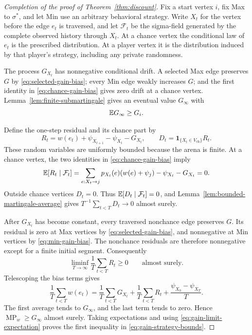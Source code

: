 \begin{proof}[Completion of the proof of Theorem~\ref{thm:discount}]
Fix a start vertex $i$, fix Max to $\sigma^*$, and let Min use an
arbitrary behavioral strategy. Write $X_t$ for the vertex before the
edge $e_t$ is traversed, and let $\mathcal F_t$ be the sigma-field
generated by the complete observed history through $X_t$. At a chance
vertex the conditional law of $e_t$ is the prescribed distribution.
At a player vertex it is the
distribution induced by that player's strategy, including any private
randomness.

The process $G_{X_t}$ has nonnegative conditional drift. A selected Max
edge preserves $G$ by \eqref{eq:selected-gain-bias}; every Min edge
weakly increases $G$; and the first identity in
\eqref{eq:chance-gain-bias} gives zero drift at a chance vertex.
Lemma~\ref{lem:finite-submartingale} gives an eventual value
$G_\infty$ with
\begin{equation}
                         \mathbb E G_\infty\ge G_i.
\label{eq:gain-limit-expectation}
\end{equation}

Define the one-step residual and its chance part by
\[
 R_t=w(e_t)+\psi_{X_{t+1}}-\psi_{X_t}-G_{X_t},
 \qquad
 D_t=\mathbf 1_{\{X_t\in V_{\mathrm{ch}}\}}R_t.
\]
These random variables are uniformly bounded because the arena is
finite. At a chance vertex, the two identities in
\eqref{eq:chance-gain-bias} imply
\[
 \mathbb E[R_t\mid\mathcal F_t]
   =\sum_{e:X_t\to j}p_{X_t}(e)(w(e)+\psi_j)
      -\psi_{X_t}-G_{X_t}=0.
\]
Outside chance vertices $D_t=0$. Thus
$\mathbb E[D_t\mid\mathcal F_t]=0$, and
Lemma~\ref{lem:bounded-martingale-average} gives
$T^{-1}\sum_{t<T}D_t\to0$ almost surely.

After $G_{X_t}$ has become constant, every traversed nonchance edge
preserves $G$. Its residual is zero at Max vertices by
\eqref{eq:selected-gain-bias}, and nonnegative at Min vertices by
\eqref{eq:min-gain-bias}. The nonchance residuals are therefore
nonnegative except for a finite initial segment. Consequently
\[
                    \liminf_{T\to\infty}\frac1T\sum_{t<T}R_t\ge0
                    \qquad\text{almost surely}.
\]
Telescoping the bias terms gives
\begin{equation}
 \frac1T\sum_{t<T}w(e_t)
   =\frac1T\sum_{t<T}G_{X_t}
     +\frac1T\sum_{t<T}R_t
     +\frac{\psi_{X_0}-\psi_{X_T}}{T}.
\label{eq:gain-bias-telescoping}
\end{equation}
The first average tends to $G_\infty$, and the last term tends to zero.
Hence $\operatorname{MP}_w\ge G_\infty$ almost surely. Taking
expectations and using \eqref{eq:gain-limit-expectation} proves the
first inequality in \eqref{eq:gain-strategy-bounds}.


\end{proof}
